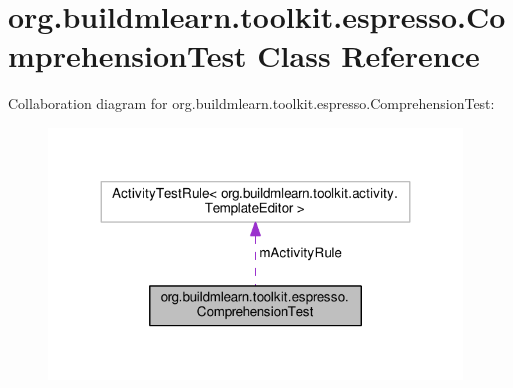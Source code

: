 \hypertarget{classorg_1_1buildmlearn_1_1toolkit_1_1espresso_1_1ComprehensionTest}{}\section{org.\+buildmlearn.\+toolkit.\+espresso.\+Comprehension\+Test Class Reference}
\label{classorg_1_1buildmlearn_1_1toolkit_1_1espresso_1_1ComprehensionTest}


Collaboration diagram for org.\+buildmlearn.\+toolkit.\+espresso.\+Comprehension\+Test\+:
\nopagebreak
\begin{figure}[H]
\begin{center}
\leavevmode
\includegraphics[width=311pt]{classorg_1_1buildmlearn_1_1toolkit_1_1espresso_1_1ComprehensionTest__coll__graph}
\end{center}
\end{figure}
